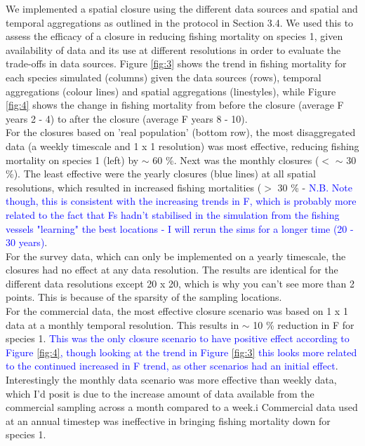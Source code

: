 \documentclass[review]{elsarticle}
\begin{document}
We implemented a spatial closure using the different data sources and spatial
and temporal aggregations as outlined in the protocol in Section 3.4. We used
this to assess the efficacy of a closure in reducing fishing mortality on
species 1, given availability of data and its use at different resolutions in
order to evaluate the trade-offs in data sources. Figure \ref{fig:3} shows the
trend in fishing mortality for each species simulated (columns) given the data
sources (rows), temporal aggregations (colour lines) and spatial aggregations
(linestyles), while Figure \ref{fig:4} shows the change in fishing mortality
from before the closure (average F years 2 - 4) to after the closure (average F
years 8 - 10). \\

For the closures based on 'real population' (bottom row), the most
disaggregated data (a weekly timescale and 1 x 1 resolution) was most
effective, reducing fishing mortality on species 1 (left) by $\sim$ 60 \%. Next
was the monthly closures ($<$ $\sim$ 30 \%).  The least effective were the
yearly closures (blue lines) at all spatial resolutions, which resulted in
increased fishing mortalities ($>$ 30 \% - \textcolor{blue}{N.B. Note though,
this is consistent with the increasing trends in F, which is probably more
related to the fact that Fs hadn't stabilised in the simulation from the
fishing vessels "learning" the best locations - I will rerun the sims for a
longer time (20 - 30 years)}. \\

For the survey data, which can only be implemented on a yearly timescale, the
closures had no effect at any data resolution. The results are identical for
the different data resolutions except 20 x 20, which is why you can't see more
than 2 points. This is because of the sparsity of the sampling locations.\\

For the commercial data, the most effective closure scenario was based on 1 x 1
data at a monthly temporal resolution. This results in $\sim$ 10 \% reduction
in F for species 1. \textcolor{blue}{This was the only closure scenario to have
	positive effect according to Figure \ref{fig:4}, though looking at the
	trend in Figure \ref{fig:3} this looks more related to the continued
	increased in F trend, as other scenarios had an initial effect}.
Interestingly the monthly data scenario was more effective than weekly data,
which I'd posit is due to the increase amount of data available from the
commercial sampling across a month compared to a week.i Commercial data used at
an annual timestep was ineffective in bringing fishing mortality down for
species 1. \\
\end{document}
